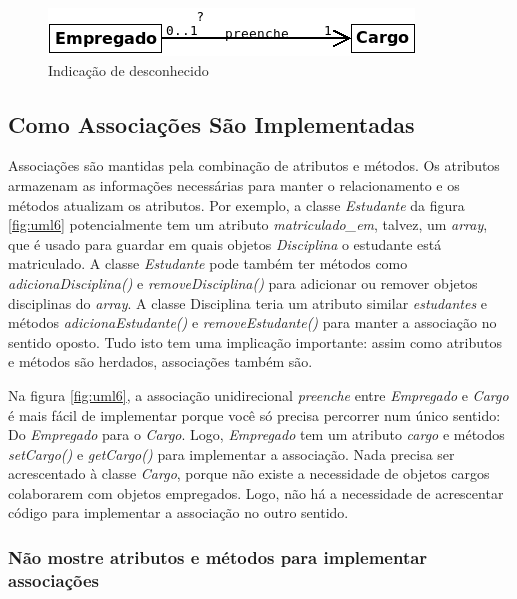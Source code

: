 \documentclass[
	article,			%
	12pt,				%
	openright,
	twoside,			%
	a4paper,			%
	english,			%
	french,
	brazil,				%
	sumario=tradicional
	]{abntex2}
\begin{document}
\begin{figure}[h]
\begin{center}
\includegraphics[scale=0.6]{assocCls3.png} 
\caption{Indicação de desconhecido} \label{fig:uml7}
\end{center}
\end{figure}

\subsection{Como Associações São Implementadas}

Associações são mantidas pela combinação de atributos e métodos. Os atributos armazenam as informações necessárias para manter o relacionamento e os métodos atualizam os atributos. Por exemplo, a classe \emph{Estudante} da figura \ref{fig:uml6} potencialmente tem um atributo \emph{matriculado\_em}, talvez, um \textit{array}, que é usado para guardar em quais objetos \emph{Disciplina} o estudante está matriculado. A classe \emph{Estudante} pode também ter métodos como \emph{adicionaDisciplina()} e \emph{removeDisciplina()} para adicionar ou remover objetos disciplinas do \textit{array}. A classe Disciplina teria um atributo similar \emph{estudantes} e métodos \emph{adicionaEstudante()} e \emph{removeEstudante()} para manter a associação no sentido oposto. Tudo isto tem uma implicação importante: assim como atributos e métodos são herdados, associações também são.

Na figura \ref{fig:uml6}, a associação unidirecional \emph{preenche} entre \emph{Empregado} e \emph{Cargo} é mais fácil de implementar porque você só precisa percorrer num único sentido: Do \emph{Empregado} para o \emph{Cargo}. Logo, \emph{Empregado} tem um atributo \emph{cargo} e métodos \emph{setCargo()} e \emph{getCargo()} para implementar a associação. Nada precisa ser acrescentado à classe \emph{Cargo}, porque não existe a necessidade de objetos cargos colaborarem com objetos empregados. Logo, não há a necessidade de acrescentar código para implementar a associação no outro sentido.

\subsubsection{Não mostre atributos e métodos para implementar associações}
\end{document}
